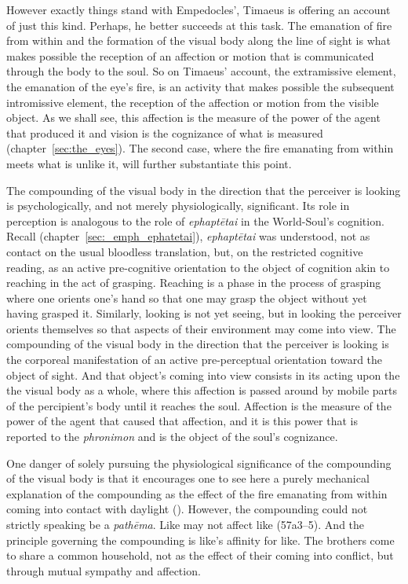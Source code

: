 However exactly things stand with Empedocles', Timaeus is offering an account of just this kind. Perhaps, he better succeeds at this task. The emanation of fire from within and the formation of the visual body along the line of sight is what makes possible the reception of an affection or motion that is communicated through the body to the soul. So on Timaeus' account, the extramissive element, the emanation of the eye's fire, is an activity that makes possible the subsequent intromissive element, the reception of the affection or motion from the visible object. As we shall see, this affection is the measure of the power of the agent that produced it and vision is the cognizance of what is measured (chapter~\ref{sec:the_eyes}). The second case, where the fire emanating from within meets what is unlike it, will further substantiate this point.

The compounding of the visual body in the direction that the perceiver is looking is psychologically, and not merely physiologically, significant. Its role in perception is analogous to the role of \emph{ephaptētai} in the World-Soul's cognition. Recall (chapter~\ref{sec:_emph_ephatetai}), \emph{ephaptētai} was understood, not as contact on the usual bloodless translation, but, on the restricted cognitive reading, as an active pre-cognitive orientation to the object of cognition akin to reaching in the act of grasping. Reaching is a phase in the process of grasping where one orients one's hand so that one may grasp the object without yet having grasped it. Similarly, looking is not yet seeing, but in looking the perceiver orients themselves so that aspects of their environment may come into view. The compounding of the visual body in the direction that the perceiver is looking is the corporeal manifestation of an active pre-perceptual orientation toward the object of sight. And that object's coming into view consists in its acting upon the the visual body as a whole, where this affection is passed around by mobile parts of the percipient's body until it reaches the soul. Affection is the measure of the power of the agent that caused that affection, and it is this power that is reported to the \emph{phronimon} and is the object of the soul's cognizance.

One danger of solely pursuing the physiological significance of the compounding of the visual body is that it encourages one to see here a purely mechanical explanation of the compounding as the effect of the fire emanating from within coming into contact with daylight (\citealt[130-1]{Betegh:2019fq}). However, the compounding could not strictly speaking be a \emph{pathēma}. Like may not affect like (57a3–5). And the principle governing the compounding is like's affinity for like. The brothers come to share a common household, not as the effect of their coming into conflict, but through mutual sympathy and affection.

